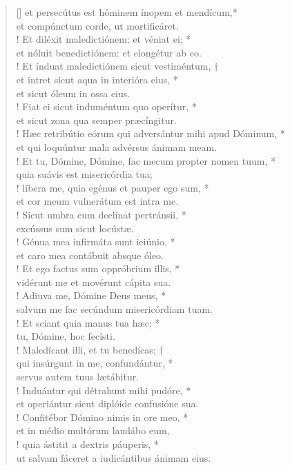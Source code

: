 \begin{verse}[\versewidth]
{et persecútus est hóminem ínopem et mendícum,*\\
et compúnctum corde, ut mortificáret.\\!
\vin  Et diléxit maledictiónem: et véniat ei; *\\
\vin  et nóluit benedictiónem: et elongétur ab eo.\\!
Et índuat maledictiónem sicut vestiméntum, †\\
et intret sicut aqua in interióra eius, *\\
et sicut óleum in ossa eius.\\!
\vin  Fiat ei sicut induméntum quo operítur, *\\
\vin  et sicut zona qua semper præcíngitur.\\!
Hæc retribútio eórum \verselinebreak qui adversántur mihi apud Dóminum, *\\
et qui loquúntur mala advérsus ánimam meam.\\!}
\vin  Et tu, Dómine, Dómine, \verselinebreak fac mecum propter nomen tuum, *\\
\vin  quia suávis est misericórdia tua;\\!
líbera me, quia egénus et pauper ego sum, *\\
et cor meum vulnerátum est intra me.\\!
\vin  Sicut umbra cum declínat pertránsii, *\\
\vin  excússus sum sicut locústæ.\\!
Génua mea infirmáta sunt ieiúnio, *\\
et caro mea contábuit absque óleo.\\!
\vin  Et ego factus sum oppróbrium illis, *\\
\vin  vidérunt me et movérunt cápita sua.\\! 
Adiuva me, Dómine Deus meus, *\\
salvum me fac secúndum misericórdiam tuam.\\!
\vin  Et sciant quia manus tua hæc; *\\
\vin  tu, Dómine, hoc fecísti.\\!
Maledícant illi, et tu benedícas; †\\
qui insúrgunt in me, confundántur, *\\
servus autem tuus lætábitur.\\!
\vin  Induántur qui détrahunt mihi pudóre, *\\
\vin  et operiántur sicut diplóide confusióne sua.\\!
Confitébor Dómino nimis in ore meo, *\\
et in médio multórum laudábo eum,\\!
\vin  quia ástitit a dextris páuperis, *\\
\vin  ut salvam fáceret a iudicántibus ánimam eius.
\end{verse}
\vspace{1cm}


